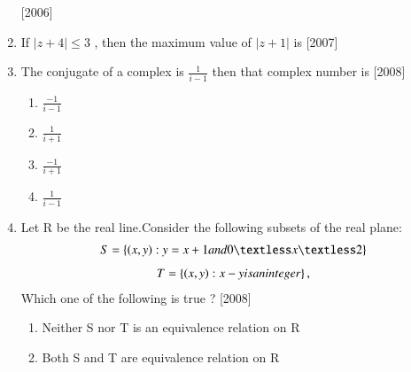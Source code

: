 \documentclass[journal,12pt,twocolumn,article]{IEEEtran}
\theoremstyle{remark}
\begin{document}
\begin{enumerate}[start = 14]
\hfill{[2006]}
\begin{enumerate}
\end{enumerate}
\item If $|z+4|\leq 3$ , then the maximum value of $|z+1|$ is
\hfill{[2007]}                                     
\begin{enumerate}                                  
\end{enumerate}
\item The conjugate of a complex is $\frac{1}{i-1}$ then that complex number is
\hfill{[2008]}
\begin{multicols}{4}
\begin{enumerate}
\item $\frac{-1}{i-1}$
\item $\frac{1}{i+1}$
\item $\frac{-1}{i+1}$
\item $\frac{1}{i-1}$
\end{enumerate}
\end{multicols}
\item Let R be the real line.Consider the following subsets of the real plane: 
\begin{align}
S=\cbrak{(x,y):y=x+1 and 0{\textless}x{\textless}2}
\end{align}
\begin{align}
T=\left\{(x,y):x-y is an integer\right\}, 
\end{align}
Which one of the following is true ?
\hfill{[2008]}
\begin{enumerate}
\item Neither S nor T is an equivalence relation on R                                        
                                
\item Both S and T are equivalence relation on R   
                                

\end{enumerate}
\end{enumerate}
\end{document}
